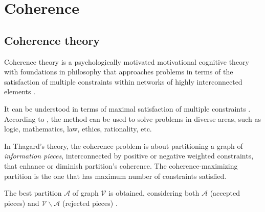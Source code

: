 





%

\def\coh{\mathrm{coh}}
\def\cohi{\mathrm{\widetilde{coh}}}


\section{Coherence}
\label{sec:Coherence}

\subsection{Coherence theory}

\begin{displayquote}
Coherence theory is a psychologically motivated motivational cognitive theory with
foundations in philosophy that approaches problems in terms of the satisfaction
of multiple constraints within networks of highly interconnected elements
\cite[p.~19]{UAB-Thesis}.
\end{displayquote}


It can be understood in terms of maximal satisfaction of multiple
constraints \cite{ThagVerb98}
.
According to \cite{ThagVerb98}, the method can be used to solve problems in
diverse areas, such as logic, mathematics, law, ethics, rationality, etc.


In Thagard's theory, the coherence problem is about partitioning a graph of
\emph{information pieces}, interconnected by positive or negative weighted
constraints, that enhance or diminish partition's coherence.
The coherence-maximizing partition is the one that has maximum number of constraints
satisfied.


The best partition $\mathcal{A}$ 
of graph  $\mathcal{V}$  is obtained, considering both
$\mathcal{A}$ (accepted pieces) and
$\mathcal{V} \backslash \mathcal{A}$ (rejected pieces) \cite{ThagVerb98}.

